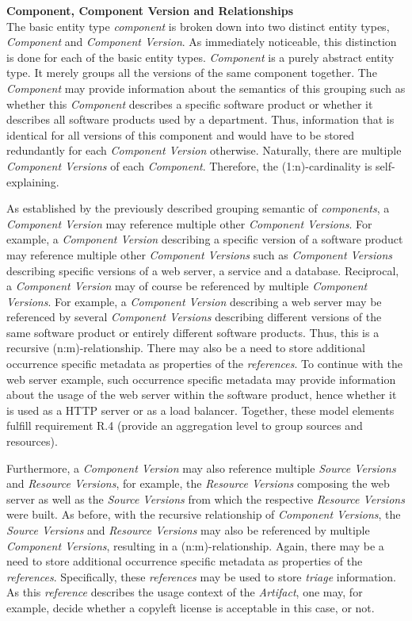 \noindent\textbf{Component, Component Version and Relationships}\\
The basic entity type \emph{component} is broken down into two distinct entity types, \emph{Component} and \emph{Component Version}. As immediately noticeable, this distinction is done for each of the basic entity types. \emph{Component} is a purely abstract entity type. It merely groups all the versions of the same component together. The \emph{Component} may provide information about the semantics of this grouping such as whether this \emph{Component} describes a specific software product or whether it describes all software products used by a department. Thus, information that is identical for all versions of this component and would have to be stored redundantly for each \emph{Component Version} otherwise. Naturally, there are multiple \emph{Component Versions} of each \emph{Component}. Therefore, the (1:n)-cardinality is self-explaining.\par 
As established by the previously described grouping semantic of \emph{components}, a \emph{Component Version} may reference multiple other \emph{Component Versions}. For example, a \emph{Component Version} describing a specific version of a software product may reference multiple other \emph{Component Versions} such as \emph{Component Versions} describing specific versions of a web server, a service and a database. Reciprocal, a \emph{Component Version} may of course be referenced by multiple \emph{Component Versions}. For example, a \emph{Component Version} describing a web server may be referenced by several \emph{Component Versions} describing different versions of the same software product or entirely different software products. Thus, this is a recursive (n:m)-relationship. There may also be a need to store additional occurrence specific metadata as properties of the \emph{references}. To continue with the web server example, such occurrence specific metadata may provide information about the usage of the web server within the software product, hence whether it is used as a HTTP server or as a load balancer. Together, these model elements fulfill requirement R.4 (provide an aggregation level to group sources and resources).\par
Furthermore, a \emph{Component Version} may also reference multiple \emph{Source Versions} and \emph{Resource Versions}, for example, the \emph{Resource Versions} composing the web server as well as the \emph{Source Versions} from which the respective \emph{Resource Versions} were built. As before, with the recursive relationship of \emph{Component Versions}, the \emph{Source Versions} and \emph{Resource Versions} may also be referenced by multiple \emph{Component Versions}, resulting in a (n:m)-relationship. Again, there may be a need to store additional occurrence specific metadata as properties of the \emph{references}. Specifically, these \emph{references} may be used to store \emph{triage} information. As this \emph{reference} describes the usage context of the \emph{Artifact}, one may, for example, decide whether a copyleft license is acceptable in this case, or not.\\ 

